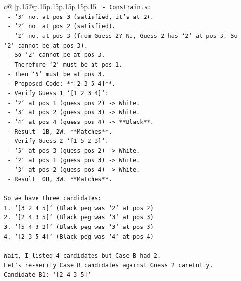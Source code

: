 \documentclass{article}
\begin{document}
{\begin{supertabular}{c@{$\;$}|p{.15\linewidth}@{}p{.15\linewidth}p{.15\linewidth}p{.15\linewidth}p{.15\linewidth}p{.15\linewidth}}
{{{\texttt{   {-} Constraints:} \\
\texttt{     {-} `3` not at pos 3 (satisfied, it's at 2).} \\
\texttt{     {-} `2` not at pos 2 (satisfied).} \\
\texttt{     {-} `2` not at pos 3 (from Guess 2? No, Guess 2 has `2` at pos 3. So `2` cannot be at pos 3).} \\
\texttt{     {-} So `2` cannot be at pos 3.} \\
\texttt{     {-} Therefore `2` must be at pos 1.} \\
\texttt{     {-} Then `5` must be at pos 3.} \\
\texttt{   {-} Proposed Code: **{[}2 3 5 4{]}**.} \\
\texttt{   {-} Verify Guess 1 `{[}1 2 3 4{]}`:} \\
\texttt{     {-} `2` at pos 1 (guess pos 2) {-}> White.} \\
\texttt{     {-} `3` at pos 2 (guess pos 3) {-}> White.} \\
\texttt{     {-} `4` at pos 4 (guess pos 4) {-}> **Black**.} \\
\texttt{     {-} Result: 1B, 2W. **Matches**.} \\
\texttt{   {-} Verify Guess 2 `{[}1 5 2 3{]}`:} \\
\texttt{     {-} `5` at pos 3 (guess pos 2) {-}> White.} \\
\texttt{     {-} `2` at pos 1 (guess pos 3) {-}> White.} \\
\texttt{     {-} `3` at pos 2 (guess pos 4) {-}> White.} \\
\texttt{     {-} Result: 0B, 3W. **Matches**.} \\
\\ 
\texttt{So we have three candidates:} \\
\texttt{1. `{[}3 2 4 5{]}` (Black peg was `2` at pos 2)} \\
\texttt{2. `{[}2 4 3 5{]}` (Black peg was `3` at pos 3)} \\
\texttt{3. `{[}5 4 3 2{]}` (Black peg was `3` at pos 3)} \\
\texttt{4. `{[}2 3 5 4{]}` (Black peg was `4` at pos 4)} \\
\\ 
\texttt{Wait, I listed 4 candidates but Case B had 2.} \\
\texttt{Let's re{-}verify Case B candidates against Guess 2 carefully.} \\
\texttt{Candidate B1: `{[}2 4 3 5{]}`} \\
}}}
\end{supertabular}}
\end{document}
